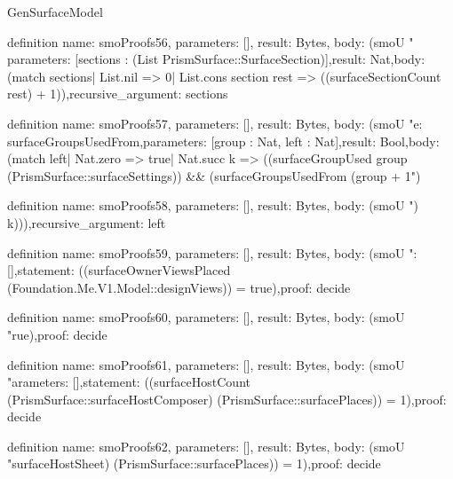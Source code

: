 \begin{lexlean}{GenSurfaceModel}
\begin{semanticmodule}
{definition{
  name: smoProofs56,
  parameters: [],
  result: Bytes,
  body: (smoU " parameters: [sections : (List PrismSurface::SurfaceSection)],\n  result: Nat,\n  body: (match sections\n    | List.nil => 0\n    | List.cons section rest => ((surfaceSectionCount rest) + 1)),\n  recursive_argument: sections\n}\n{}

definition{
  name: smoProofs57,
  parameters: [],
  result: Bytes,
  body: (smoU "e: surfaceGroupsUsedFrom,\n  parameters: [group : Nat, left : Nat],\n  result: Bool,\n  body: (match left\n    | Nat.zero => true\n    | Nat.succ k => ((surfaceGroupUsed group (PrismSurface::surfaceSettings)) && (surfaceGroupsUsedFrom (group + 1")
}

definition{
  name: smoProofs58,
  parameters: [],
  result: Bytes,
  body: (smoU ") k))),\n  recursive_argument: left\n}\n{}\n{}

definition{
  name: smoProofs59,
  parameters: [],
  result: Bytes,
  body: (smoU ": [],\n  statement: ((surfaceOwnerViewsPlaced (Foundation.Me.V1.Model::designViews)) = true),\n  proof: decide{}\n}\n{}

definition{
  name: smoProofs60,
  parameters: [],
  result: Bytes,
  body: (smoU "rue),\n  proof: decide{}\n}\n{}\n{}

definition{
  name: smoProofs61,
  parameters: [],
  result: Bytes,
  body: (smoU "arameters: [],\n  statement: ((surfaceHostCount (PrismSurface::surfaceHostComposer) (PrismSurface::surfacePlaces)) = 1),\n  proof: decide{}\n}\n{}

definition{
  name: smoProofs62,
  parameters: [],
  result: Bytes,
  body: (smoU "surfaceHostSheet) (PrismSurface::surfacePlaces)) = 1),\n  proof: decide{}\n}\n{}

}
\end{semanticmodule}
\end{lexlean}

